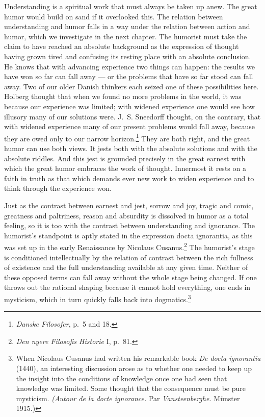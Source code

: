 \documentclass[12pt]{book}
\newcommand{\opage}[1]{\marginnote{\footnotesize\textit{[#1]}}}
\begin{document}
Understanding is a spiritual work that must always be taken up anew. The great humor would
build on sand if it overlooked this. The relation between understanding and humor falls in
a way under the relation between action and humor, which we investigate in the next
chapter. The humorist must take the claim to have reached an absolute background as the
expression of thought having grown tired and confusing its resting place with an absolute
conclusion. He knows that with advancing experience two things can happen: the results we
have won so far can fall away --- or the problems that have so far stood can fall away. Two
of our older Danish thinkers each seized one of these possibilities here. Holberg thought
that when we found no more problems in the world, it was because our experience was
limited; with widened experience one would see how illusory many of our solutions were.
J.~S. Sneedorff thought, on the contrary, that with widened experience many of our present
problems would fall away, because they are owed only to our narrow horizon.\footnote{%
\textit{Danske Filosofer}, p.~5 and 18.} They are both right, and the great humor can use
both views. It jests both with the absolute solutions and with the absolute riddles. And
this jest is grounded precisely in the great earnest with which the great humor embraces
the work of thought. Innermost it rests on a faith in truth as that which demands ever new
work to widen experience and to think through the experience won.

Just as the contrast between earnest and jest, sorrow and joy, tragic and comic, greatness
and paltriness, reason and absurdity is dissolved in humor as a total feeling, so it is too
\opage{121}with the contrast between understanding and ignorance. The humorist's standpoint
is aptly stated in the expression docta ignorantia, as this was set up in the early
Renaissance by Nicolaus Cusanus.\footnote{\textit{Den nyere Filosofis Historie} I,
p.~81.} The humorist's stage is conditioned intellectually by the relation of contrast
between the rich fullness of existence and the full understanding available at any given
time. Neither of these opposed terms can fall away without the whole stage being changed.
If one throws out the rational shaping because it cannot hold everything, one ends in
mysticism, which in turn quickly falls back into dogmatics.\footnote{When Nicolaus Cusanus
had written his remarkable book \textit{De docta ignorantia} (1440), an interesting
discussion arose as to whether one needed to keep up the insight into the conditions of
knowledge once one had seen that knowledge was limited. Some thought that the consequence
must be pure mysticism. \textit{(Autour de la docte ignorance.} Par
\textit{Vansteenberghe.} Münster 1915.)} %
\end{document}
